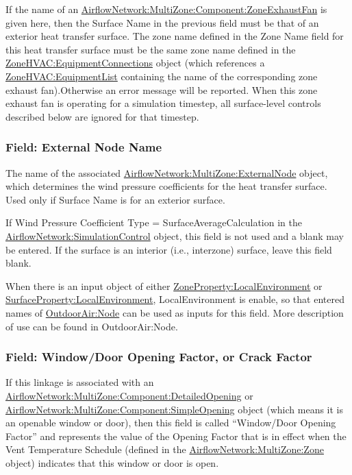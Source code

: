 If the name of an \hyperref[airflownetworkmultizonecomponentzoneexhaustfan]{AirflowNetwork:MultiZone:Component:ZoneExhaustFan} is given here, then the Surface Name in the previous field must be that of an exterior heat transfer surface. The zone name defined in the Zone Name field for this heat transfer surface must be the same zone name defined in the \hyperref[zonehvacequipmentconnections]{ZoneHVAC:EquipmentConnections} object (which references a \hyperref[zonehvacequipmentlist]{ZoneHVAC:EquipmentList} containing the name of the corresponding zone exhaust fan).Otherwise an error message will be reported. When this zone exhaust fan is operating for a simulation timestep, all surface-level controls described below are ignored for that timestep.

\subsubsection{Field: External Node Name}\label{field-external-node-name}

The name of the associated \hyperref[airflownetworkmultizoneexternalnode]{AirflowNetwork:MultiZone:ExternalNode} object, which
determines the wind pressure coefficients for the heat transfer surface. Used
only if Surface Name is for an exterior surface.

If Wind Pressure Coefficient Type = SurfaceAverageCalculation in the \hyperref[airflownetworksimulationcontrol]{AirflowNetwork:\hyperref[simulationcontrol]{SimulationControl}}
object, this field is not used and a blank may be entered. If the surface is an
interior (i.e., interzone) surface, leave this field blank.

When there is an input object of either \hyperref[ZonePropertylocalEnvironment]{ZoneProperty:LocalEnvironment} or \hyperref[surfacePropertylocalEnvironment]{SurfaceProperty:LocalEnvironment}, LocalEnvironment is enable, so that entered names of \hyperref[outdoorairnode]{OutdoorAir:Node} can be used as inputs for this field. More description of use can be found in  OutdoorAir:Node.

\subsubsection{Field: Window/Door Opening Factor, or Crack Factor}\label{field-windowdoor-opening-factor-or-crack-factor}

If this linkage is associated with an \hyperref[airflownetworkmultizonecomponentdetailedopening]{AirflowNetwork:MultiZone:Component:DetailedOpening} or \hyperref[airflownetworkmultizonecomponentsimpleopening]{AirflowNetwork:MultiZone:Component:SimpleOpening} object (which means it is an openable window or door), then this field is called ``Window/Door Opening Factor'' and represents the value of the Opening Factor that is in effect when the Vent Temperature Schedule (defined in the \hyperref[airflownetworkmultizonezone]{AirflowNetwork:MultiZone:Zone} object) indicates that this window or door is open.

